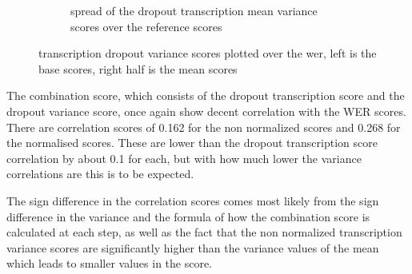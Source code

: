 \begin{figure}
\begin{subfigure}{0.4\linewidth}
        \caption{spread of the dropout transcription mean variance scores over the reference scores}
    \end{subfigure}
    \caption{transcription dropout variance scores plotted over the wer, left is the base scores, right half is the mean scores}
    \label{fig:dropout transcript variance scores}
    \end{figure}
    
The combination score, which consists of the dropout transcription score and the dropout variance score, once again show decent correlation with the WER scores. There are correlation scores of 0.162 for the non normalized scores and 0.268 for the normalised scores. These are lower than the dropout transcription score correlation by about 0.1 for each, but with how much lower the variance correlations are this is to be expected.

The sign difference in the correlation scores comes most likely from the sign difference in the variance and the formula of how the combination score is calculated at each step, as well as the fact that the non normalized transcription variance scores are significantly higher than the variance values of the mean which leads to smaller values in the score. 

